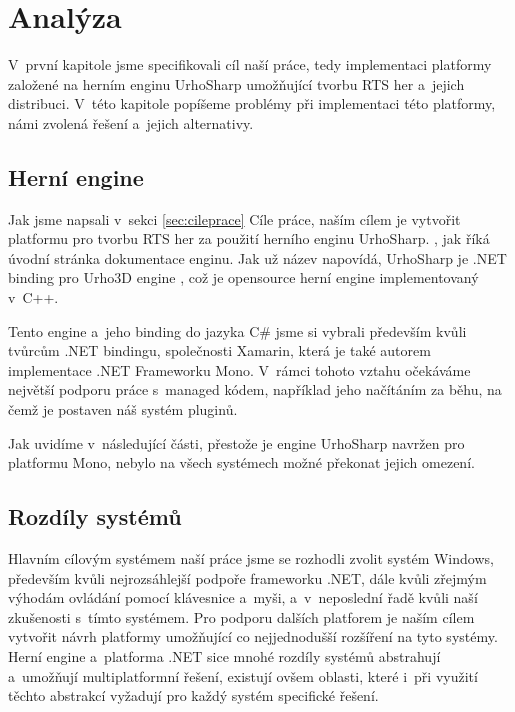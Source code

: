 \chapter{Analýza}
V~první kapitole jsme specifikovali cíl naší práce, tedy implementaci platformy založené na herním enginu UrhoSharp umožňující tvorbu RTS her a~jejich distribuci. V~této kapitole popíšeme problémy při implementaci této platformy, námi zvolená řešení a~jejich alternativy.

\section{Herní engine}
Jak jsme napsali v~sekci \ref{sec:cileprace} Cíle práce, naším cílem je vytvořit platformu pro tvorbu RTS her za použití herního enginu UrhoSharp. \textit{ } \citep{site:urhosharp}, jak říká úvodní stránka dokumentace enginu. Jak už název napovídá, UrhoSharp je .NET binding pro Urho3D engine \citep{site:urho3D}, což je opensource herní engine implementovaný v~C++.

Tento engine a~jeho binding do jazyka C\# jsme si vybrali především kvůli tvůrcům .NET bindingu, společnosti Xamarin, která je také autorem implementace .NET Frameworku Mono. V~rámci tohoto vztahu očekáváme největší podporu práce s~managed kódem, například jeho načítáním za běhu, na čemž je postaven náš systém pluginů. 

Jak uvidíme v~následující části, přestože je engine UrhoSharp navržen pro platformu Mono, nebylo na všech systémech možné překonat jejich omezení.

\section{Rozdíly systémů}
\label{sec:system_dif}
Hlavním cílovým systémem naší práce jsme se rozhodli zvolit systém Windows, především kvůli nejrozsáhlejší podpoře frameworku .NET, dále kvůli zřejmým výhodám ovládání pomocí klávesnice a~myši, a~v~neposlední řadě kvůli naší zkušenosti s~tímto systémem. Pro podporu dalších platforem je naším cílem vytvořit návrh platformy umožňující co nejjednodušší rozšíření na tyto systémy. Herní engine a~platforma .NET sice mnohé rozdíly systémů abstrahují a~umožňují multiplatformní řešení, existují ovšem oblasti, které i~při využití těchto abstrakcí vyžadují pro každý systém specifické řešení.  

